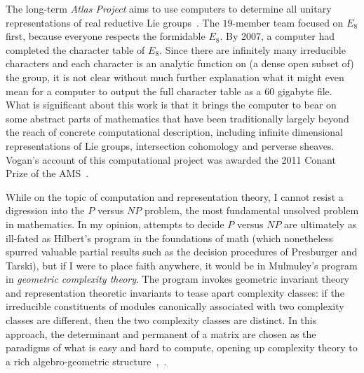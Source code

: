 \documentclass{llncs}
\begin{document}
The long-term {\it Atlas Project} aims to use computers to determine
all unitary representations of real reductive Lie groups~\cite{Atlas}.
The $19$-member team   focused on $E_8$
first, because everyone respects the formidable $E_8$.  By 2007, a
computer had completed the character table of $E_8$.  Since there are
infinitely many irreducible characters and each character is an
analytic function on (a dense open subset of) the group, it is not
clear without much further explanation what it might even mean for a
computer to output the full character table as a $60$ gigabyte file.  What
is significant about this work is that it brings the computer to bear
on some abstract parts of mathematics that have been traditionally
largely beyond the reach of concrete computational description,
including infinite dimensional representations of Lie groups,
intersection cohomology and perverse sheaves.  Vogan's account of this
computational project was awarded the 2011 Conant Prize of the
AMS~\cite{VE8}.






While on the topic of computation and representation theory, I cannot
resist a digression into the $P$ versus $NP$ problem, the most
fundamental unsolved problem in mathematics. In my opinion, attempts
to decide $P$ versus $NP$ are ultimately as ill-fated as Hilbert's
program in the foundations of math (which nonetheless spurred valuable
partial results such as the decision procedures of Presburger and
Tarski), but if I were to place faith anywhere, it would be in
Mulmuley's program in {\it geometric complexity theory}.  The program
invokes geometric invariant theory and representation theoretic
invariants to tease apart complexity classes: if the irreducible
constituents of modules canonically associated with two complexity
classes are different, then the two complexity classes are distinct.
In this approach, the determinant and permanent of a matrix are chosen
as the paradigms of what is easy and hard to compute, opening up
complexity theory to a rich algebro-geometric
structure~\cite{Mul11},~\cite{FPNP}.
\end{document}
